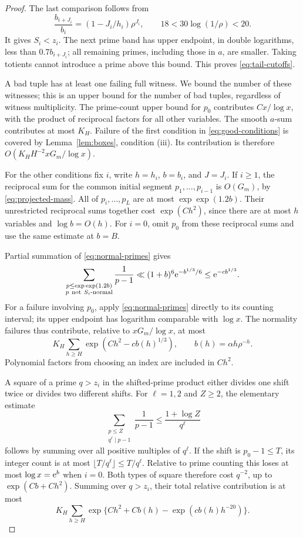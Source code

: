 \begin{proof}
The last comparison follows from
\[
 \frac{b_{i+J_i}}{b_i}=(1-J_i/h_i)\rho^{J_i},
 \qquad 18<30\log(1/\rho)<20.
\]
It gives \(S_i<z_i\).  The next prime band has upper endpoint,
in double logarithms, less than \(0.7b_{i+J_i}\); all remaining
primes, including those in \(a\), are smaller.  Taking totients
cannot introduce a prime above this bound.  This proves
\eqref{eq:tail-cutoffs}.

A bad tuple has at least one failing full witness.  We bound the
number of these witnesses; this is an upper bound for the number of
bad tuples, regardless of witness multiplicity.
The prime-count upper bound for \(p_0\) contributes
\(Cx/\log x\), with the product of reciprocal factors for all
other variables.  The smooth \(a\)-sum contributes at most \(K_H\).
Failure of the first condition in \eqref{eq:good-conditions}
is covered by Lemma~\ref{lem:boxes}, condition (iii).
Its contribution is therefore \(O(K_HH^{-2}xG_m/\log x)\).

For the other conditions fix \(i\), write \(h=h_i\), \(b=b_i\),
and \(J=J_i\).  If \(i\ge1\), the reciprocal sum for the common
initial segment \(p_1,\ldots,p_{i-1}\) is \(O(G_m)\), by
\eqref{eq:projected-mass}.  All of \(p_i,\ldots,p_L\) are at most
\(\exp\exp(1.2b)\).  Their unrestricted reciprocal sums together
cost \(\exp(Ch^2)\), since there are at most \(h\) variables and
\(\log b=O(h)\).  For \(i=0\), omit \(p_0\) from these reciprocal
sums and use the same estimate at \(b=B\).

Partial summation of \eqref{eq:normal-primes} gives
\[
 \sum_{\substack{p\le\exp\exp(1.2b)\\
                   p\ {\rm not}\ S_i\text{-normal}}}\frac1{p-1}
 \ll(1+b)^6\mathrm e^{-b^{1/3}/6}
 \le\mathrm e^{-c b^{1/3}}.
\]
For a failure involving \(p_0\), apply
\eqref{eq:normal-primes} directly to its counting interval;
its upper endpoint has logarithm comparable with \(\log x\).
The normality failures thus contribute, relative to \(xG_m/\log x\),
at most
\begin{equation}\label{eq:normal-discard}
 K_H\sum_{h\ge H}\exp(Ch^2-cb(h)^{1/3}),
 \qquad b(h)=\alpha h\rho^{-h}.
\end{equation}
Polynomial factors from choosing an index are included in \(Ch^2\).

A square of a prime \(q>z_i\) in the shifted-prime product either
divides one shift twice or divides two different shifts.
For \(\ell=1,2\) and \(Z\ge2\), the elementary estimate
\[
 \sum_{\substack{p\le Z\\q^\ell\mid p-1}}\frac1{p-1}
 \le\frac{1+\log Z}{q^\ell}
\]
follows by summing over all positive multiples of \(q^\ell\).
If the shift is \(p_0-1\le T\), its integer count is at most
\(\lfloor T/q^\ell\rfloor\le T/q^\ell\).
Relative to prime counting this loses at most \(\log x=\mathrm e^b\)
when \(i=0\).  Both types of square therefore cost \(q^{-2}\),
up to \(\exp(Cb+Ch^2)\).  Summing over \(q>z_i\), their total
relative contribution is at most
\begin{equation}\label{eq:square-discard}
 K_H\sum_{h\ge H}
 \exp\{Ch^2+Cb(h)-\exp(c b(h)h^{-20})\}.
\end{equation}


\end{proof}
